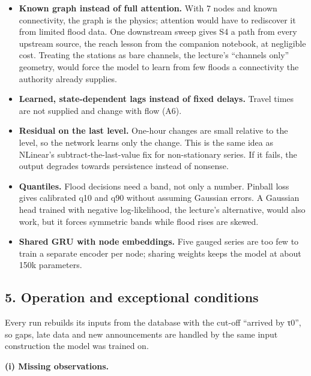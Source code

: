 \documentclass[11pt]{article}
\providecommand{\tightlist}{}
\begin{document}
\begin{itemize}
\tightlist
\item
  \textbf{Known graph instead of full attention.} With 7 nodes and known connectivity, the graph is the physics; attention would have to rediscover it from limited flood data. One downstream sweep gives S4 a path from every upstream source, the reach lesson from the companion notebook, at negligible cost. Treating the stations as bare channels, the lecture's ``channels only'' geometry, would force the model to learn from few floods a connectivity the authority already supplies.
\item
  \textbf{Learned, state-dependent lags instead of fixed delays.} Travel times are not supplied and change with flow (A6).
\item
  \textbf{Residual on the last level.} One-hour changes are small relative to the level, so the network learns only the change. This is the same idea as NLinear's subtract-the-last-value fix for non-stationary series. If it fails, the output degrades towards persistence instead of nonsense.
\item
  \textbf{Quantiles.} Flood decisions need a band, not only a number. Pinball loss gives calibrated q10 and q90 without assuming Gaussian errors. A Gaussian head trained with negative log-likelihood, the lecture's alternative, would also work, but it forces symmetric bands while flood rises are skewed.
\item
  \textbf{Shared GRU with node embeddings.} Five gauged series are too few to train a separate encoder per node; sharing weights keeps the model at about 150k parameters.
\end{itemize}

\subsection*{5. Operation and exceptional conditions}

Every run rebuilds its inputs from the database with the cut-off ``arrived by τ0'', so gaps, late data and new announcements are handled by the same input construction the model was trained on.

\textbf{(i) Missing observations.}
\end{document}
